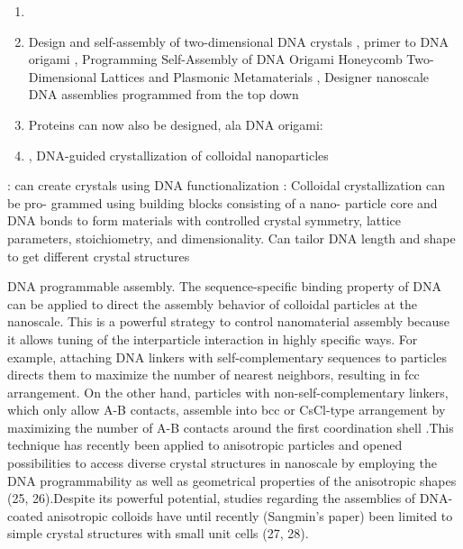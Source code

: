 \begin{enumerate}
\item \cite{Jankowski_2009_JChemPhys,Jankowski_2011_JPhysChemB,Jankowski_2012_SoftMatter}
\item Design and self-assembly of two-dimensional DNA crystals \cite{Winfree_1998_Nature}, primer to DNA origami \cite{Castro_2011_Nature}, Programming Self-Assembly of DNA Origami Honeycomb Two-Dimensional Lattices and Plasmonic Metamaterials \cite{Wang_2016_JACS}, Designer nanoscale DNA assemblies programmed from the top down \cite{Veneziano_2016_Science}
\item Proteins can now also be designed, ala DNA origami: \cite{Huang_2016_Nature}
\item \cite{Mirkin_1996_Nature,Park_2008_Nature,OBrien_2016_JACS,Liu_2016_Nature}, DNA-guided crystallization of colloidal nanoparticles \cite{Nykypanchuk_2008_Nature}
\end{enumerate}


\cite{Park_2008_Nature}: can create crystals using DNA functionalization
\cite{OBrien_2016_JACS}: Colloidal crystallization can be pro- grammed using building blocks consisting of a nano- particle core and DNA bonds to form materials with controlled crystal symmetry, lattice parameters, stoichiometry, and dimensionality. Can tailor DNA length and shape to get different crystal structures

DNA programmable assembly. The sequence-specific binding property of DNA can be applied to direct the assembly behavior of colloidal particles at the nanoscale. This is a powerful strategy to control nanomaterial assembly because it allows tuning of the interparticle interaction in highly specific ways. For example, attaching DNA linkers with self-complementary sequences to particles directs them to maximize the number of nearest neighbors, resulting in fcc arrangement. On the other hand, particles with non-self-complementary linkers, which only allow A-B contacts, assemble into bcc or CsCl-type arrangement by maximizing the number of A-B contacts around the first coordination shell \cite{Park_2008_Nature}.This technique has recently been applied to anisotropic particles and opened possibilities to access diverse crystal structures in nanoscale by employing the DNA programmability as well as geometrical properties of the anisotropic shapes (25, 26).Despite its powerful potential, studies regarding the assemblies of DNA-coated anisotropic colloids have until recently (Sangmin's paper) been limited to simple crystal structures with small unit cells (27, 28). 

